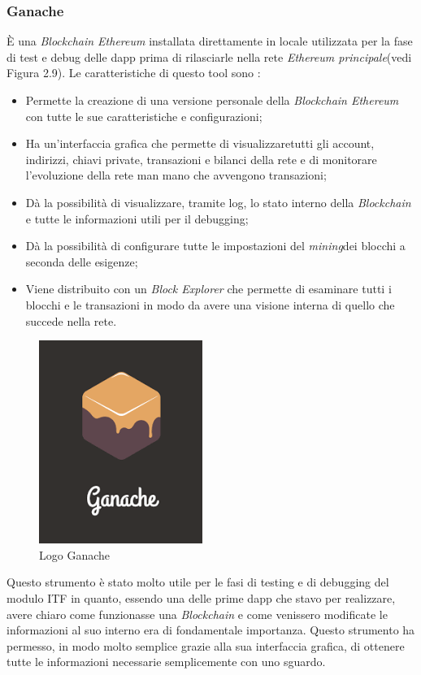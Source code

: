 \subsubsection{Ganache}

È una \textit{Blockchain Ethereum} installata direttamente in locale utilizzata per la fase di test e debug delle \gls{dapp} prima di rilasciarle nella rete \textit{Ethereum principale}(vedi Figura 2.9).
Le caratteristiche di questo tool sono \cite{ganache}:
\begin{itemize}
	\item Permette la creazione di una versione personale della \textit{Blockchain Ethereum} con tutte le sue caratteristiche e configurazioni;
	\item Ha un'interfaccia grafica che permette di visualizzaretutti gli account, indirizzi, chiavi private, transazioni e bilanci della rete e di monitorare l'evoluzione della rete man mano che avvengono transazioni;
	\item Dà la possibilità di visualizzare, tramite log, lo stato interno della \textit{Blockchain} e tutte le informazioni utili per il debugging;
	\item Dà la possibilità di configurare tutte le impostazioni del \emph{\gls{mining}}\glsfirstoccur dei blocchi a seconda delle esigenze;
	\item Viene distribuito con un \textit{Block Explorer} che permette di esaminare tutti i blocchi e le transazioni in modo da avere una visione interna di quello che succede nella rete.
\end{itemize}
\begin{figure}[h]
	\centering
	\includegraphics[scale=0.5]{immagini/ganache}
	\caption{Logo Ganache}
\end{figure}
Questo strumento è stato molto utile per le fasi di testing e di debugging del modulo \gls{ITF} in quanto, essendo una delle prime \gls{dapp} che stavo per realizzare, avere chiaro come funzionasse una \textit{Blockchain} e come venissero modificate le informazioni al suo interno era di fondamentale importanza. Questo strumento ha permesso, in modo molto semplice grazie alla sua interfaccia grafica, di ottenere tutte le informazioni necessarie semplicemente con uno sguardo.
